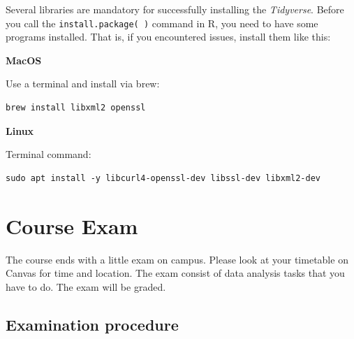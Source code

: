 \documentclass[
]{scrartcl}
\begin{document}
Several libraries are mandatory for successfully installing the \emph{Tidyverse}. Before you call the \texttt{install.package(\ )} command in R, you need to have some programs installed. That is, if you encountered issues, install them like this:

\textbf{MacOS}

Use a terminal and install via brew:

\begin{verbatim}
brew install libxml2 openssl
\end{verbatim}

\textbf{Linux}

Terminal command:

\begin{verbatim}
sudo apt install -y libcurl4-openssl-dev libssl-dev libxml2-dev
\end{verbatim}

\section{Course Exam}\label{course-exam}

The course ends with a little exam on campus. Please look at your timetable on Canvas for time and location. The exam consist of data analysis tasks that you have to do. The exam will be graded.

\subsection*{Examination procedure}\label{examination-procedure}
\end{document}
